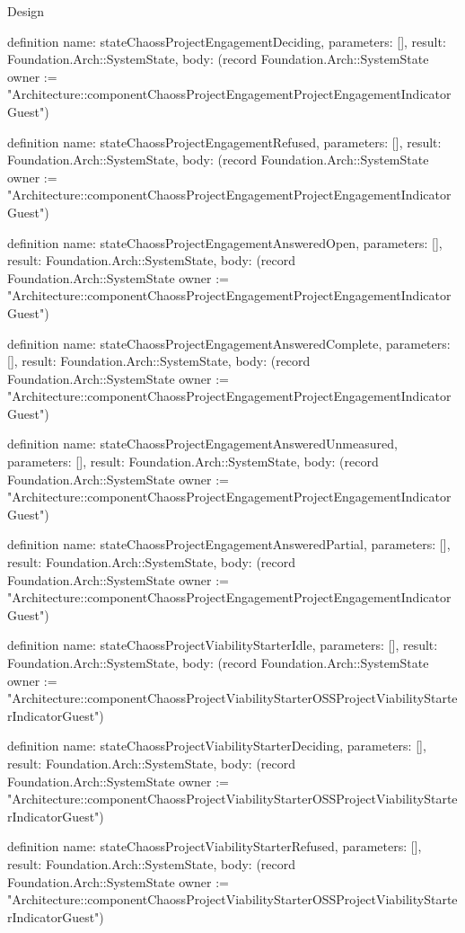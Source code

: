 \begin{lexlean}{Design}
\begin{semanticmodule}
definition{
  name: stateChaossProjectEngagementDeciding,
  parameters: [],
  result: Foundation.Arch::SystemState,
  body: (record Foundation.Arch::SystemState {owner := "Architecture::componentChaossProjectEngagementProjectEngagementIndicatorGuest"})
}

definition{
  name: stateChaossProjectEngagementRefused,
  parameters: [],
  result: Foundation.Arch::SystemState,
  body: (record Foundation.Arch::SystemState {owner := "Architecture::componentChaossProjectEngagementProjectEngagementIndicatorGuest"})
}

definition{
  name: stateChaossProjectEngagementAnsweredOpen,
  parameters: [],
  result: Foundation.Arch::SystemState,
  body: (record Foundation.Arch::SystemState {owner := "Architecture::componentChaossProjectEngagementProjectEngagementIndicatorGuest"})
}

definition{
  name: stateChaossProjectEngagementAnsweredComplete,
  parameters: [],
  result: Foundation.Arch::SystemState,
  body: (record Foundation.Arch::SystemState {owner := "Architecture::componentChaossProjectEngagementProjectEngagementIndicatorGuest"})
}

definition{
  name: stateChaossProjectEngagementAnsweredUnmeasured,
  parameters: [],
  result: Foundation.Arch::SystemState,
  body: (record Foundation.Arch::SystemState {owner := "Architecture::componentChaossProjectEngagementProjectEngagementIndicatorGuest"})
}

definition{
  name: stateChaossProjectEngagementAnsweredPartial,
  parameters: [],
  result: Foundation.Arch::SystemState,
  body: (record Foundation.Arch::SystemState {owner := "Architecture::componentChaossProjectEngagementProjectEngagementIndicatorGuest"})
}

definition{
  name: stateChaossProjectViabilityStarterIdle,
  parameters: [],
  result: Foundation.Arch::SystemState,
  body: (record Foundation.Arch::SystemState {owner := "Architecture::componentChaossProjectViabilityStarterOSSProjectViabilityStarterIndicatorGuest"})
}

definition{
  name: stateChaossProjectViabilityStarterDeciding,
  parameters: [],
  result: Foundation.Arch::SystemState,
  body: (record Foundation.Arch::SystemState {owner := "Architecture::componentChaossProjectViabilityStarterOSSProjectViabilityStarterIndicatorGuest"})
}

definition{
  name: stateChaossProjectViabilityStarterRefused,
  parameters: [],
  result: Foundation.Arch::SystemState,
  body: (record Foundation.Arch::SystemState {owner := "Architecture::componentChaossProjectViabilityStarterOSSProjectViabilityStarterIndicatorGuest"})
}


\end{semanticmodule}
\end{lexlean}
